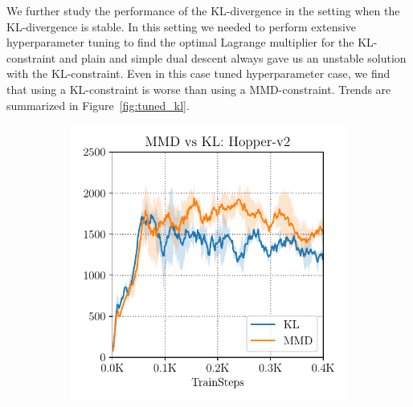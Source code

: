 We further study the performance of the KL-divergence in the setting when the KL-divergence is stable. In this setting we needed to perform extensive hyperparameter tuning to find the optimal Lagrange multiplier for the KL-constraint and plain and simple dual descent always gave us an unstable solution with the KL-constraint. Even in this case tuned hyperparameter case, we find that using a KL-constraint is worse than using a MMD-constraint. Trends are summarized in Figure~\ref{fig:tuned_kl}. 
\begin{figure}[t]
    \centering
    \begin{subfigure}[t]{0.31\textwidth}
        \centering
        \includegraphics[width=0.99\linewidth]{chapters/bear/images/kl_vs_mmd_hopper_again.pdf}
    \end{subfigure}%
    ~
    \begin{subfigure}[t]{0.31\textwidth}
        \centering

\end{subfigure}
\end{figure}
